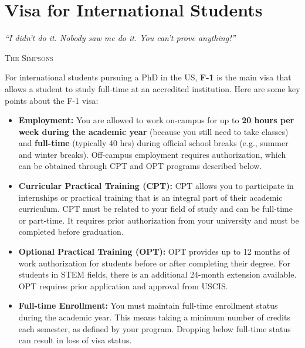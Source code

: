 \documentclass[oneside,11pt,dvipsnames]{book}
\newcommand{\myepigraphsimpsons}[1]{
\epigraph{\vspace{-0.2in} \emph{#1}}{\textsc{The Simpsons}}
}
\begin{document}
\chapter{Visa for International Students}\label{sec:visa}

\myepigraphsimpsons{``I didn't do it. Nobody saw me do it. You can't prove anything!''}


For international students pursuing a PhD in the US, \textbf{F-1} is the main visa that allows a student to study full-time at an accredited institution.  Here are some key points about the F-1 visa:

\begin{itemize}
\item \textbf{Employment:} You are allowed to work on-campus for up to \textbf{20 hours per week during the academic year} (because you still need to take classes) and \textbf{full-time} (typically 40 hrs) during official school breaks (e.g., summer and winter breaks). Off-campus employment requires authorization, which can be obtained through CPT and OPT programs described below.

\item \textbf{Curricular Practical Training (CPT):} CPT allows you to participate in internships or practical training that is an integral part of their academic curriculum. CPT must be related to your field of study and can be full-time or part-time. It requires prior authorization from your university and must be completed before graduation.

\item \textbf{Optional Practical Training (OPT):} OPT provides up to 12 months of work authorization for students before or after completing their degree. For students in STEM fields, there is an additional 24-month extension available. OPT requires prior application and approval from USCIS.

\item \textbf{Full-time Enrollment:} You must maintain full-time enrollment status during the academic year. This means taking a minimum number of credits each semester, as defined by your program. Dropping below full-time status can result in loss of visa status.
\end{itemize}


\end{document}
